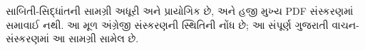 \documentclass[../../include/open-logic-part]{subfiles}
\begin{document}

\begin{editorial}
  સાબિતી-સિદ્ધાંતની સામગ્રી અધૂરી અને પ્રાયોગિક છે,
  અને હજી મુખ્ય PDF સંસ્કરણમાં સમાવાઈ નથી.
  આ મૂળ અંગ્રેજી સંસ્કરણની સ્થિતિની નોંધ છે;
  આ સંપૂર્ણ ગુજરાતી વાચન-સંસ્કરણમાં આ સામગ્રી સામેલ છે.
\end{editorial}


\OLEndPartHook
\end{document}
